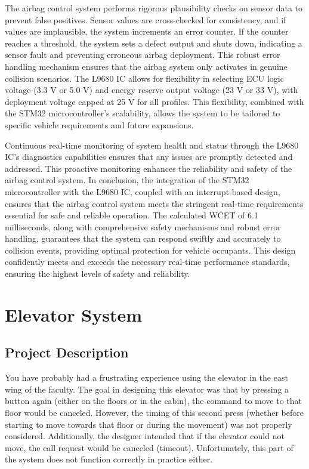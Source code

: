 \documentclass[12pt	]{article}
\begin{document}
The airbag control system performs rigorous plausibility checks on sensor data to prevent false positives. Sensor values are cross-checked for consistency, and if values are implausible, the system increments an error counter. If the counter reaches a threshold, the system sets a defect output and shuts down, indicating a sensor fault and preventing erroneous airbag deployment. This robust error handling mechanism ensures that the airbag system only activates in genuine collision scenarios. The L9680 IC allows for flexibility in selecting ECU logic voltage (3.3 V or 5.0 V) and energy reserve output voltage (23 V or 33 V), with deployment voltage capped at 25 V for all profiles. This flexibility, combined with the STM32 microcontroller's scalability, allows the system to be tailored to specific vehicle requirements and future expansions.

Continuous real-time monitoring of system health and status through the L9680 IC's diagnostics capabilities ensures that any issues are promptly detected and addressed. This proactive monitoring enhances the reliability and safety of the airbag control system. In conclusion, the integration of the STM32 microcontroller with the L9680 IC, coupled with an interrupt-based design, ensures that the airbag control system meets the stringent real-time requirements essential for safe and reliable operation. The calculated WCET of 6.1 milliseconds, along with comprehensive safety mechanisms and robust error handling, guarantees that the system can respond swiftly and accurately to collision events, providing optimal protection for vehicle occupants. This design confidently meets and exceeds the necessary real-time performance standards, ensuring the highest levels of safety and reliability.






\newpage

\section{Elevator System}


\subsection{Project Description}
You have probably had a frustrating experience using the elevator in the east wing of the faculty. The goal in designing this elevator was that by pressing a button again (either on the floors or in the cabin), the command to move to that floor would be canceled. However, the timing of this second press (whether before starting to move towards that floor or during the movement) was not properly considered. Additionally, the designer intended that if the elevator could not move, the call request would be canceled (timeout). Unfortunately, this part of the system does not function correctly in practice either.
\end{document}
